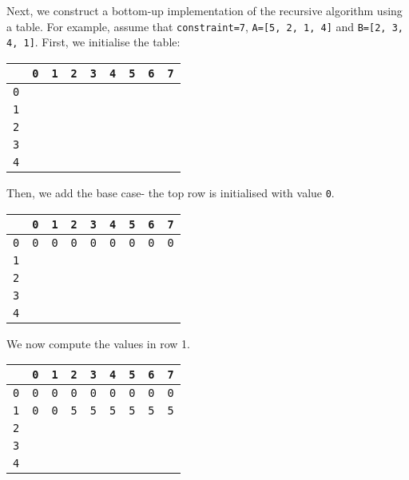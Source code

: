 \documentclass[a4paper, openany]{memoir}
\begin{document}
\noindent Next, we construct a bottom-up implementation of the recursive algorithm using a table. For example, assume that \texttt{constraint=7}, \texttt{A=[5, 2, 1, 4]} and \texttt{B=[2, 3, 4, 1]}. First, we initialise the table:
\begin{center}
    \begin{tabular}{|c|c|c|c|c|c|c|c|c|}
        \hline
         & \texttt{0} & \texttt{1} & \texttt{2} & \texttt{3} & \texttt{4} & \texttt{5} & \texttt{6} & \texttt{7} \\
        \hline
        \texttt{0} & & & & & & & & \\
        \hline
        \texttt{1} & & & & & & & & \\
        \hline
        \texttt{2} & & & & & & & & \\
        \hline
        \texttt{3} & & & & & & & & \\
        \hline
        \texttt{4} & & & & & & & & \\
        \hline
    \end{tabular}
\end{center}
Then, we add the base case- the top row is initialised with value \texttt{0}.
\begin{center}
    \begin{tabular}{|c|c|c|c|c|c|c|c|c|}
        \hline
         & \texttt{0} & \texttt{1} & \texttt{2} & \texttt{3} & \texttt{4} & \texttt{5} & \texttt{6} & \texttt{7} \\
        \hline
        \texttt{0} & \texttt{0} & \texttt{0} & \texttt{0} & \texttt{0} & \texttt{0} & \texttt{0} & \texttt{0} & \texttt{0} \\
        \hline
        \texttt{1} & & & & & & & & \\
        \hline
        \texttt{2} & & & & & & & & \\
        \hline
        \texttt{3} & & & & & & & & \\
        \hline
        \texttt{4} & & & & & & & & \\
        \hline
    \end{tabular}
\end{center}
We now compute the values in row 1. 
\begin{center}
    \begin{tabular}{|c|c|c|c|c|c|c|c|c|}
        \hline
         & \texttt{0} & \texttt{1} & \texttt{2} & \texttt{3} & \texttt{4} & \texttt{5} & \texttt{6} & \texttt{7} \\
        \hline
        \texttt{0} & \texttt{0} & \texttt{0} & \texttt{0} & \texttt{0} & \texttt{0} & \texttt{0} & \texttt{0} & \texttt{0} \\
        \hline
        \texttt{1} & \texttt{0} & \texttt{0} & \texttt{5} & \texttt{5} & \texttt{5} & \texttt{5} & \texttt{5} & \texttt{5} \\
        \hline
        \texttt{2} & & & & & & & & \\
        \hline
        \texttt{3} & & & & & & & & \\
        \hline
        \texttt{4} & & & & & & & & \\
        \hline
    \end{tabular}
\end{center}
\end{document}
